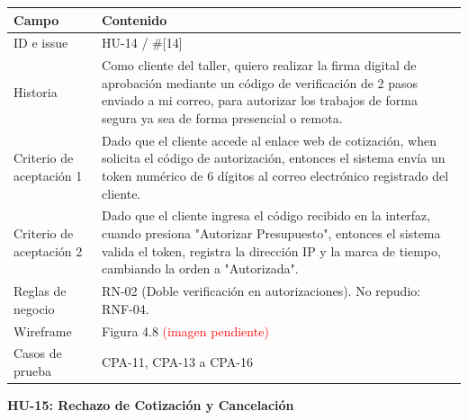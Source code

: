 {\def\LTcaptype{none} %
\begin{longtable}[]{@{}
  >{\raggedright\arraybackslash}p{}
  >{\raggedright\arraybackslash}p{}@{}}
\toprule\noalign{}
\begin{minipage}[b]{\linewidth}\raggedright
\textbf{Campo}
\end{minipage} & \begin{minipage}[b]{\linewidth}\raggedright
\textbf{Contenido}
\end{minipage} \\
\midrule\noalign{}
\endhead
\bottomrule\noalign{}
\endlastfoot
ID e issue & HU-14 / \#{[}14{]} \\
Historia & Como cliente del taller, quiero realizar la firma digital de
aprobación mediante un código de verificación de 2 pasos enviado a mi
correo, para autorizar los trabajos de forma segura ya sea de forma
presencial o remota. \\
Criterio de aceptación 1 & Dado que el cliente accede al enlace web de
cotización, when solicita el código de autorización, entonces el sistema
envía un token numérico de 6 dígitos al correo electrónico registrado
del cliente. \\
Criterio de aceptación 2 & Dado que el cliente ingresa el código
recibido en la interfaz, cuando presiona "Autorizar Presupuesto",
entonces el sistema valida el token, registra la dirección IP y la marca
de tiempo, cambiando la orden a "Autorizada". \\
Reglas de negocio & RN-02 (Doble verificación en autorizaciones). No
repudio: RNF-04. \\
Wireframe & Figura 4.8 \textcolor{red}{(imagen pendiente)} \\
Casos de prueba & CPA-11, CPA-13 a CPA-16 \\
\end{longtable}
}

\textbf{HU-15: Rechazo de Cotización y Cancelación}


